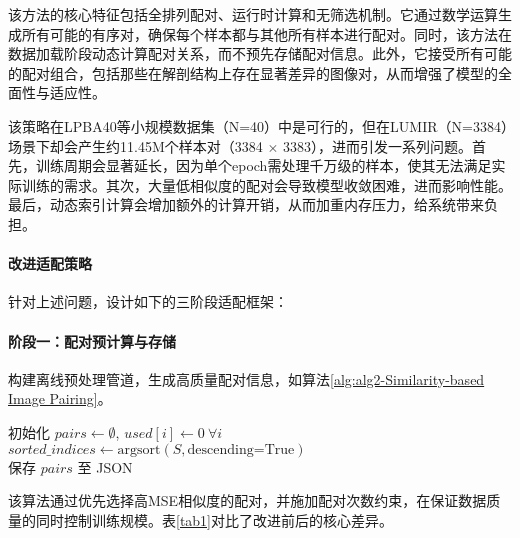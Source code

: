 该方法的核心特征包括全排列配对、运行时计算和无筛选机制。它通过数学运算生成所有可能的有序对，确保每个样本都与其他所有样本进行配对。同时，该方法在数据加载阶段动态计算配对关系，而不预先存储配对信息。此外，它接受所有可能的配对组合，包括那些在解剖结构上存在显著差异的图像对，从而增强了模型的全面性与适应性。

该策略在LPBA40等小规模数据集（N=40）中是可行的，但在LUMIR（N=3384）场景下却会产生约11.45M个样本对（3384 $\times$ 3383），进而引发一系列问题。首先，训练周期会显著延长，因为单个epoch需处理千万级的样本，使其无法满足实际训练的需求。其次，大量低相似度的配对会导致模型收敛困难，进而影响性能。最后，动态索引计算会增加额外的计算开销，从而加重内存压力，给系统带来负担。

\paragraph{改进适配策略}
针对上述问题，设计如下的三阶段适配框架：

\paragraph{阶段一：配对预计算与存储}


构建离线预处理管道，生成高质量配对信息，如算法\ref{alg:alg2-Similarity-based Image Pairing}。

\begin{algorithm}[h]
    \label{alg:alg2-Similarity-based Image Pairing}
    初始化 $pairs \gets \emptyset$, $used[i] \gets 0\ \forall i$ \\
    $sorted\_indices \gets \text{argsort}(S, \text{descending=True})$ \\
    保存 $pairs$ 至 JSON \\
\end{algorithm}

该算法通过优先选择高MSE相似度的配对，并施加配对次数约束，在保证数据质量的同时控制训练规模。表\ref{tab1}对比了改进前后的核心差异。


